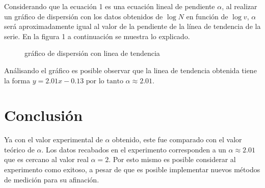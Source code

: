 \documentclass{article}
\begin{document}
\pagebreak
Considerando que la ecuación 1 es una ecuación lineal de pendiente $\alpha$, al realizar un gráfico de dispersión con los datos obtenidos de $\log N$ en función de $\log v$, $\alpha$ será aproximadamente igual al valor de la pendiente de la línea de tendencia de la serie. En la figura 1 a continuación se muestra lo explicado.

\begin{figure}[H]
\centering
{}\datatable
{}
\label{fig:graf}
\caption{gráfico de dispersión con linea de tendencia}
\end{figure}

Análisando el gráfico es posible observar que la linea de tendencia obtenida tiene la forma $y=2.01x-0.13 \text{ por lo tanto }\alpha\approx2.01$.


\section{Conclusión}
Ya con el valor experimental de $\alpha$ obtenido, este  fue comparado con el valor teórico de $\alpha$. Los datos recabados en el experimento corresponden a un $\alpha \approx 2.01$ que es cercano al valor real $\alpha=2$. Por esto mismo es posible considerar al experimento como exitoso, a pesar de que es posible implementar nuevos métodos de medición para su afinación.
\end{document}
